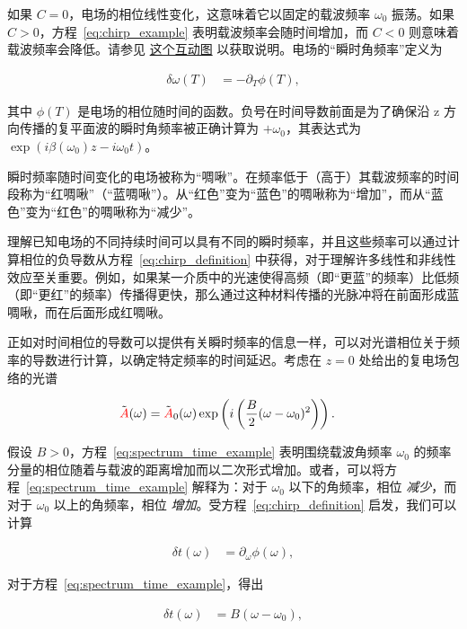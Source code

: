 如果 $C=0$，电场的相位线性变化，这意味着它以固定的载波频率 $\omega_0$ 振荡。如果 $C>0$，方程~\ref{eq:chirp_example} 表明载波频率会随时间增加，而 $C<0$ 则意味着载波频率会降低。请参见 \href{https://www.desmos.com/calculator/gd7s8nhfdn}{这个互动图} 以获取说明。电场的“瞬时角频率”定义为

\begin{align}
\label{eq:chirp_definition}
    \delta\omega(T) &= -\partial_T\phi(T),
\end{align}

其中 $\phi(T)$ 是电场的相位随时间的函数。负号在时间导数前面是为了确保沿 z 方向传播的复平面波的瞬时角频率被正确计算为 $+\omega_0$，其表达式为 $\exp(i\beta(\omega_0)z-i\omega_0 t)$。

瞬时频率随时间变化的电场被称为“啁啾”。在频率低于（高于）其载波频率的时间段称为“红啁啾”（“蓝啁啾”）。从“红色”变为“蓝色”的啁啾称为“增加”，而从“蓝色”变为“红色”的啁啾称为“减少”。

理解已知电场的不同持续时间可以具有不同的瞬时频率，并且这些频率可以通过计算相位的负导数从方程~\ref{eq:chirp_definition} 中获得，对于理解许多线性和非线性效应至关重要。例如，如果某一介质中的光速使得高频（即“更蓝”的频率）比低频（即“更红”的频率）传播得更快，那么通过这种材料传播的光脉冲将在前面形成蓝啁啾，而在后面形成红啁啾。

正如对时间相位的导数可以提供有关瞬时频率的信息一样，可以对光谱相位关于频率的导数进行计算，以确定特定频率的时间延迟。考虑在 $z=0$ 处给出的复电场包络的光谱

\begin{align}
\label{eq:spectrum_time_example}
    \Tilde{\textcolor{red}{A}}(\omega) &= \Tilde{\textcolor{red}{A}}_0(\omega)\exp\left( i\left(\frac{B}{2}(\omega-\omega_0)^2 \right)   \right).
\end{align}

假设 $B>0$，方程~\ref{eq:spectrum_time_example} 表明围绕载波角频率 $\omega_0$ 的频率分量的相位随着与载波的距离增加而以二次形式增加。或者，可以将方程~\ref{eq:spectrum_time_example} 解释为：对于 $\omega_0$ 以下的角频率，相位 \emph{减少}，而对于 $\omega_0$ 以上的角频率，相位 \emph{增加}。受方程~\ref{eq:chirp_definition} 启发，我们可以计算

\begin{align}
\label{eq:delay_definition}
    \delta t(\omega) &= \partial_\omega\phi(\omega),
\end{align}

对于方程~\ref{eq:spectrum_time_example}，得出

\begin{align}
    \delta t(\omega) &=  B(\omega-\omega_0),
\end{align}

